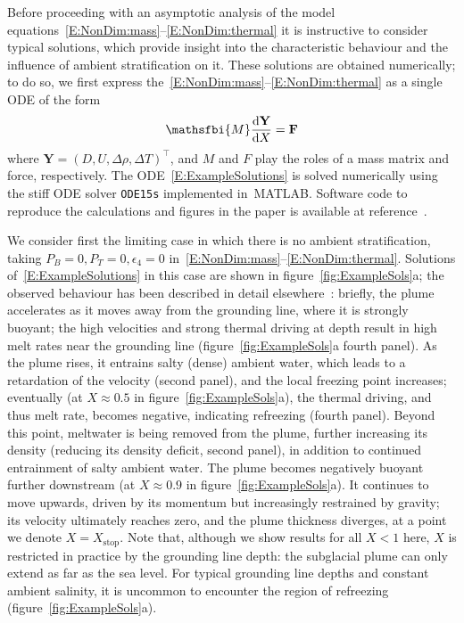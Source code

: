 \documentclass[openacc]{rsproca_new}%
\newcommand{\dd}[2]{\frac{\mathrm{d} #1}{\mathrm{d} #2}}
\newcommand{\epsfour}{\epsilon_{4}}
\newcommand{\Pb}{\textit{P}_B}  %
\newcommand{\Pt}{\textit{P}_T}
\begin{document}
Before proceeding with an asymptotic analysis of the model equations~\eqref{E:NonDim:mass}--\eqref{E:NonDim:thermal} it is instructive to consider typical solutions, which provide insight into the characteristic behaviour and the influence of ambient stratification on it. These solutions are obtained numerically; to do so, we first express the~\eqref{E:NonDim:mass}--\eqref{E:NonDim:thermal} as a single ODE of the form
\begin{equation}\label{E:ExampleSolutions}
\mathsfbi{M} \dd{\mathbf{Y}}{X} = \mathbf{F}
\end{equation}
where $\mathbf{Y} = (D, U, \Delta \rho, \Delta T)^\intercal$, and $M$ and $F$ play the roles of a mass matrix and force, respectively. The ODE~\eqref{E:ExampleSolutions} is solved numerically using the stiff 
ODE solver \texttt{ODE15s} implemented in~\textsc{MATLAB}.  Software code to reproduce the calculations and figures in the paper is available at reference~\citep{PycnoclineCode}.

We consider first the limiting case in which there is no ambient stratification, taking $\Pb = 0, \Pt = 0, \epsfour = 0$ in~\eqref{E:NonDim:mass}--\eqref{E:NonDim:thermal}. Solutions of~\eqref{E:ExampleSolutions} in this case are shown in figure~\ref{fig:ExampleSols}a; the observed behaviour has been described in detail elsewhere~\citep[see][for example]{Jenkins1991JGeophysResOceans, Jenkins2011JPhysOcean, Magorrian2016JGeoResOcean, Hewitt2020AnnRevFlu}: briefly, the plume accelerates as it moves away from the grounding line, where it is strongly buoyant; the high velocities and strong thermal driving at depth result in high melt rates near the grounding line (figure~\ref{fig:ExampleSols}a fourth panel). As the plume rises, it entrains salty (dense) ambient water, which leads to a retardation of the velocity (second panel), and the local freezing point increases; eventually (at $X \approx 0.5$ in figure~\ref{fig:ExampleSols}a), the thermal driving, and thus melt rate, becomes negative, indicating refreezing (fourth panel). Beyond this point, meltwater is being removed from the plume, further increasing its density (reducing its density deficit, second panel), in addition to continued entrainment of salty ambient water. The plume becomes negatively buoyant further downstream (at $X \approx 0.9$ in figure~\ref{fig:ExampleSols}a). It continues to move upwards, driven by its momentum but increasingly restrained by gravity; its velocity ultimately reaches zero, and the plume thickness diverges, at a point we denote $X = X_{\text{stop}}$. Note that, although we show results for all $X < 1$ here, $X$ is restricted in practice by the grounding line depth: the subglacial plume can only extend as far as the sea level. For typical grounding line depths and constant ambient salinity, it is uncommon to encounter the region of refreezing (figure~\ref{fig:ExampleSols}a). 
\end{document}
